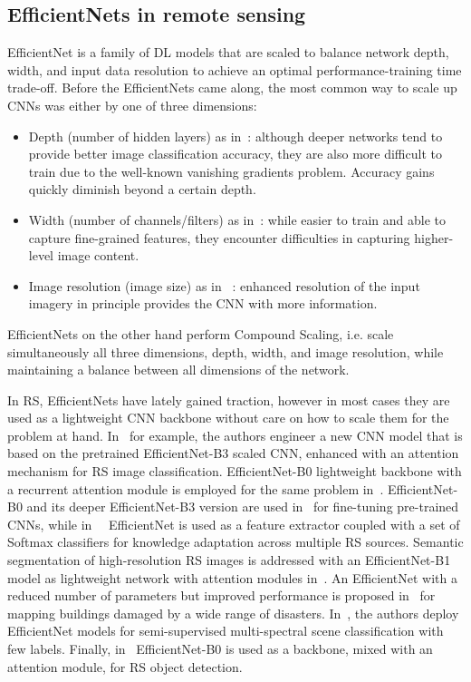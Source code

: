 \documentclass[journal]{IEEEtran}
\begin{document}
\subsection{EfficientNets in remote sensing}
EfficientNet is a family of DL models that are scaled to balance network depth, width, and input data resolution to achieve an optimal performance-training time trade-off. Before the EfficientNets came along, the most common way to scale up CNNs was either by one of three dimensions: 
\begin{itemize}
    \item Depth (number of hidden layers) as in~\cite{He_2016_CVPR}: although deeper networks tend to provide better image classification accuracy, they are also more difficult to train due to the well-known vanishing gradients problem. Accuracy gains quickly diminish beyond a certain depth. 
    \item Width (number of channels/filters) as in~\cite{DBLP:journals/corr/ZagoruykoK16}: while easier to train and able to capture fine-grained features, they encounter difficulties in capturing higher-level image content.
    \item Image resolution (image size) as in ~\cite{huang2019gpipe}: enhanced resolution of the input imagery in principle provides the CNN with more information. 
\end{itemize}
EfficientNets on the other hand perform Compound Scaling, i.e. scale simultaneously all three dimensions, depth, width, and image resolution, while maintaining a balance between all dimensions of the network. 

In RS, EfficientNets have lately gained traction, however in most cases they are used as a lightweight CNN backbone without care on how to scale them for the problem at hand. In~\cite{9320487} for example, the authors engineer a new CNN model that is based on the pretrained EfficientNet-B3 scaled CNN, enhanced with an attention mechanism for RS image classification. EfficientNet-B0 lightweight backbone with a recurrent attention module is employed for the same problem in~\cite{https://doi.org/10.1049/ipr2.12139}. EfficientNet-B0 and its deeper EfficientNet-B3 version are used in~\cite{rs11242908} for fine-tuning pre-trained CNNs, while in~~\cite{9129743} EfficientNet is used as a feature extractor coupled with a set of Softmax classifiers for knowledge adaptation across multiple RS sources. Semantic segmentation of high-resolution RS images is addressed with an EfficientNet-B1 model as lightweight network with attention modules in~\cite{9324723}. An EfficientNet with a reduced number of parameters but improved performance is proposed in~\cite{rs12101670} for mapping buildings damaged by a wide range of disasters. In~\cite{gomez2021msmatch}, the authors deploy EfficientNet models for semi-supervised multi-spectral scene classification with few labels. Finally, in~\cite{tian_resolution-aware_2020} EfficientNet-B0 is used as a backbone, mixed with an attention module, for RS object detection.
\end{document}
